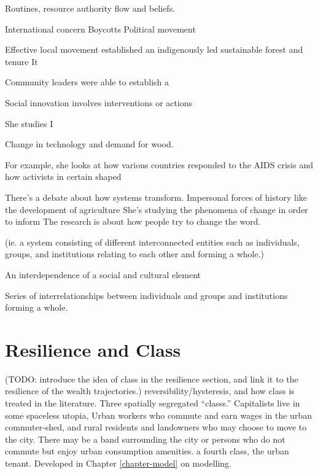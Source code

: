 Routines, resource authority flow and beliefs. 

International concern
Boycotts 
Political movement

Effective local movement established an indigenously led sustainable forest and tenure
It 



Community leaders were able to establish a 




Social innovation involves interventions or actions 




She studies I

Change in technology and demand for wood. 

For example, she looks at how various countries responded to the AIDS crisis and how activists in certain shaped 

There’s a debate about how systems transform. 
Impersonal forces of history like the development of agriculture
She’s studying the phenomena of change in order to inform 
The research is about how people try to change the word. 

(ie. a system consisting of different interconnected entities such as  individuals, groups, and institutions relating to each other and forming a whole.)

An interdependence of a social and cultural element 

Series of interrelationships between individuals and groups and institutions forming a whole. 





\section{Resilience and Class}

(TODO: introduce the idea of class in the resilience section, and link it to the resilience of the wealth trajectories.)  
reversibility/hysteresis, and how class is treated in the literature.
Three spatially segregated ``\glspl{class}.'' Capitalists live in some spaceless utopia,  Urban workers who commute and earn wages in the urban commuter-shed, and  rural residents and landowners who may choose to move to the city. There may be a band surrounding the city or persons who do not commute but enjoy urban consumption amenities. 
a fourth class, the urban tenant. 
Developed in Chapter \ref{chapter-model} on modelling.